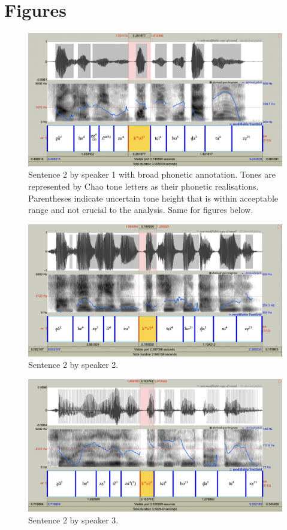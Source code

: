 \documentclass[11pt]{article}
\begin{document}
\section{Figures}
\begin{figure}[H]
    \centering
    \includegraphics[width=0.6\paperwidth]{s2_sp1.png}
    \caption{Sentence 2 by speaker 1 with broad phonetic annotation. Tones are represented by Chao tone letters as their phonetic realisations. Parentheses indicate uncertain tone height that is within acceptable range and not crucial to the analysis. Same for figures below.\label{fig:s2_sp1}}
\end{figure}

\begin{figure}[H]
    \centering
    \includegraphics[width=0.6\paperwidth]{s2_sp2.png}
    \caption{Sentence 2 by speaker 2.\label{fig:s2_sp2}}
\end{figure}

\begin{figure}[H]
    \centering
    \includegraphics[width=0.6\paperwidth]{s2_sp3.png}
    \caption{Sentence 2 by speaker 3.\label{fig:s2_sp3}}
\end{figure}
\end{document}
